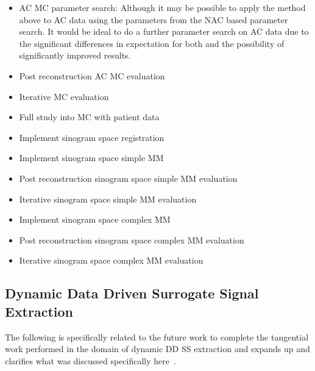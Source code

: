 \begin{itemize}
                \item \gls{AC} \gls{MC} parameter search: Although it may be possible to apply the method above to \gls{AC} data using the parameters from the \gls{NAC} based parameter search. It would be ideal to do a further parameter search on \gls{AC} data due to the significant differences in expectation for both and the possibility of significantly improved results.
    
                \item Post reconstruction \gls{AC} \gls{MC} evaluation
    
                \item Iterative \gls{MC} evaluation
    
                \item Full study into \gls{MC} with patient data
    
                \item Implement sinogram space registration
    
                \item Implement sinogram space simple \gls{MM}
    
                \item Post reconstruction sinogram space simple \gls{MM} evaluation
    
                \item Iterative sinogram space simple \gls{MM} evaluation
    
                \item Implement sinogram space complex \gls{MM}
    
                \item Post reconstruction sinogram space complex \gls{MM} evaluation
    
                \item Iterative sinogram space complex \gls{MM} evaluation
            \end{itemize}
        
        \subsection{Dynamic Data Driven Surrogate Signal Extraction} \label{sec:future_work_dynamic_data_driven_surrogate_signal_extraction}
            The following is specifically related to the future work to complete the tangential work performed in the domain of dynamic \gls{DD} \gls{SS} extraction and expands up and clarifies what was discussed specifically here~.
            
